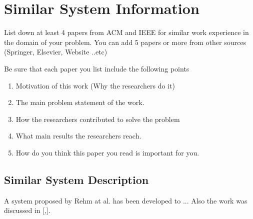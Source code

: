\documentclass[12pt]{article}
\begin{document}
\section{Similar System Information}
List down at least 4 papers from ACM and IEEE for similar work experience in the domain of your problem. You can add 5 papers or more from other sources (Springer, Elsevier, Website ..etc)

Be sure that each paper you list include the following points

\begin{enumerate}
\item Motivation of this work (Why the researchers do it)
\item The main problem statement of the work.
\item How the researchers contributed to solve the problem
\item What main results the researchers reach.
\item How do you think this paper you read is important for you. 
\end{enumerate}

\subsection{Similar System Description}
A system proposed by Rehm at al. \cite{Rehm} has been developed to ... Also the work was discussed in [\cite{Weiser},\cite{abc123}].




\end{document}
